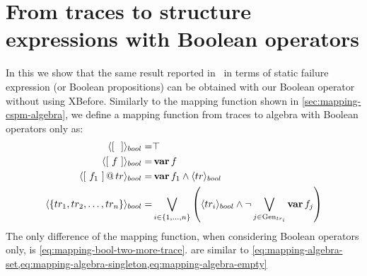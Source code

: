 \documentclass[12pt,openright,twoside,a4paper,oldfontcommands,english,brazil,final]{abntex2}
\makeatletter
\theoremstyle{theo}
\def\varop{\ensuremath\operatorname{\mathbf{var}}}
\newcommand{\var}[1]{\ensuremath\varop #1}
\newcommand{\append}[2]{\ensuremath #1 \operatorname{\mathbf{@}} #2}
\newcommand{\tracetobool}[1]{\ensuremath\langle{#1}\rangle_{bool}}
\newcommand{\trace}[1]{\ensuremath\left[~#1~\right]}
\def\generators{\ensuremath\mathrm{Gen}}
\makeatother
\begin{document}
\section{From traces to structure expressions with Boolean operators}
\label{sec:traces-to-structure-expressions-boolean-operators}

In this  we show that the same result reported in~\cite{DM2012} in terms of static failure expression (or Boolean propositions) can be obtained with our Boolean operator without using \ac{XBefore}.
Similarly to the mapping function shown in \cref{sec:mapping-cspm-algebra}, we define a mapping function from traces to \ac{algebra} with Boolean operators only as:
%
\begin{subequations}
\begin{align}
\tracetobool{\trace{}} = & \top\label{eq:mapping-bool-empty}\\
%
\tracetobool{\trace{f}} = & \var{f}\label{eq:mapping-bool-singleton}\\
%
\tracetobool{\append{\trace{f_1}}{tr}} = & 
    \var{f_1} \land \tracetobool{tr}\label{eq:mapping-bool-two-more-trace}\\
%
\tracetobool{\left\{ tr_1, tr_2, \ldots, tr_n  \right\}} =& 
  \bigvee_{i \in \left\{1,\ldots,n\right\}} 
  \left(\tracetobool{tr_i} \land 
  \lnot \bigvee_{j \in \generators_{tr_i}} \var{f_j}\right)\label{eq:mapping-bool-set}
\end{align}
\end{subequations}
%
The only difference of the mapping function, when considering Boolean operators only, is \cref{eq:mapping-bool-two-more-trace}.
 are similar to \cref{eq:mapping-algebra-set,eq:mapping-algebra-singleton,eq:mapping-algebra-empty}
\end{document}
